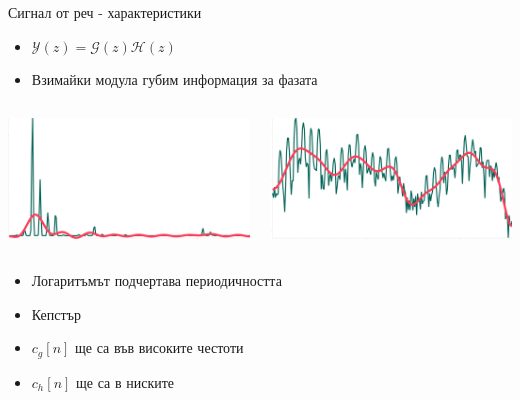 \documentclass[9pt]{beamer}
\begin{document}
    \begin{frame}[t]{Сигнал от реч - характеристики}
        \begin{itemize}
            \setlength\itemsep{\fill}
            \pause
            \item $\mathcal{Y}(z) = \mathcal{G}(z)\mathcal{H}(z)$
            \pause 
            \item Взимайки модула губим информация за фазата
        \end{itemize}
        \pause
        \begin{columns}
            \begin{column}{0.48\textwidth}
                 \includegraphics[width=\textwidth]{aaaa.png}
            \end{column}
            \pause
            \hfill
            \begin{column}{0.48\textwidth}
                 \includegraphics[width=\textwidth]{aaaa_log.png}
            \end{column}
        \end{columns}
        \begin{itemize}
            \setlength\itemsep{\fill}
            \pause
            \item Логаритъмът подчертава периодичността
            \pause
            \item Кепстър
            \pause
            \item $c_g[n]$ ще са във високите честоти 
            \pause
            \item $c_h[n]$ ще са в ниските
        \end{itemize}
    \end{frame}
\end{document}
